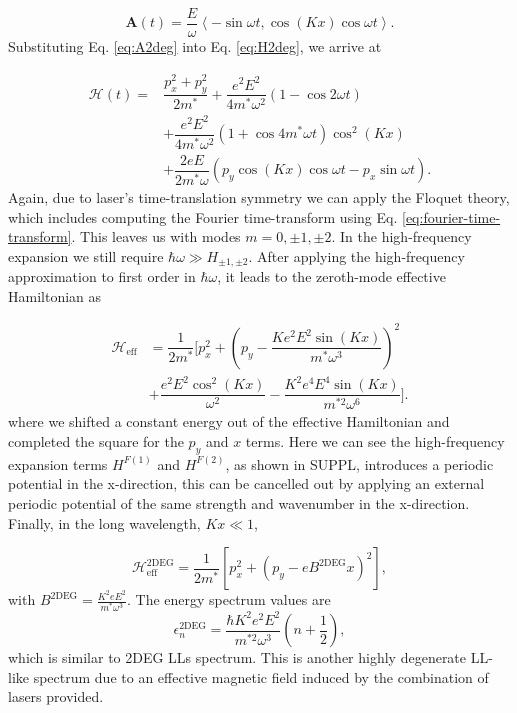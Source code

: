 \documentclass[aps,prb,twocolumn,showpacs,superscriptaddress]{revtex4-2}
\renewcommand{\vec}[1]{\mathbf{#1}}
\newcommand{\ham}{\mathcal{H}}
\begin{document}
\begin{equation}\label{eq:A2deg}
  \vec{A}(t)= \dfrac{E}{\omega} \left\langle -\sin \omega t, \cos{(Kx)} \cos{\omega t} \right\rangle.
\end{equation}%
Substituting Eq. \eqref{eq:A2deg} into Eq. \eqref{eq:H2deg}, we arrive at

\begin{align}\label{eq:H2time}
  \ham(t) = &\dfrac{p_x^2 + p_y^2}{2m^*} + \dfrac{e^2 E^2}{4m^* \omega^2}(1-\cos{2\omega t}) \nonumber \\
  &+ \dfrac{e^2 E^2}{4m^*\omega^2}(1+\cos{4m^* \omega t}) \cos^2{(Kx)} \nonumber \\
  &+\dfrac{2eE}{2m^* \omega} \left(p_y \cos{(Kx)}\cos{\omega t} -  p_x \sin{\omega t}\right).
\end{align}
Again, due to laser's time-translation symmetry we can apply the Floquet theory, which includes computing the Fourier time-transform using Eq. \eqref{eq:fourier-time-transform}.
This leaves us with modes $m=0,\pm1,\pm2$.
In the high-frequency expansion we still require $\hbar \omega \gg H_{\pm1,\pm2}$.
After applying the high-frequency approximation to first order in $\hbar \omega$, it leads to the zeroth-mode effective Hamiltonian as

\begin{align}\label{eq:H2eff}
  \ham_{\text{eff}} &= \dfrac{1}{2m^*} \Biggl[ p_x^2 + \left(p_y - \dfrac{K e^2 E^2 \sin{(Kx)}}{m^*\omega^3} \right)^2 \nonumber \\
  &+ \dfrac{e^2 E^2 \cos^2{(Kx)}}{\omega^2}  - \dfrac{K^2 e^4 E^4 \sin{(Kx)}}{m^{*2}\omega^6} \Biggr]. \nonumber
\end{align}
where we shifted a constant energy out of the effective Hamiltonian and completed the square for the $p_y$ and $x$ terms.
Here we can see the high-frequency expansion terms $H^{F(1)}$ and $H^{F(2)}$, as shown in SUPPL, introduces a periodic potential in the x-direction, this can be cancelled out by applying an external periodic potential of the same strength and wavenumber in the x-direction.
Finally, in the long wavelength, $Kx \ll 1$,

\begin{equation}\label{eq:Heff2deg}
  \ham_{\text{eff}}^{\text{2DEG}} = \dfrac{1}{2m^*} \left[ p_x^2 + {\left(p_y - eB^{\text{2DEG}}x \right)}^2  \right],
\end{equation}
with $B^{\text{2DEG}} = \tfrac{K^2 e E^2 }{m^*\omega^3}$.
The energy spectrum values are
\begin{equation}\label{eq:2DEGenergy}
  \epsilon_n^{\text{2DEG}} = \dfrac{\hbar K^2 e^2 E^2}{m^{*2}\omega^3} \left(n+\dfrac{1}{2}\right),
\end{equation}
which is similar to 2DEG LLs spectrum.
This is another highly degenerate LL-like spectrum due to an effective magnetic field induced by the combination of lasers provided.
\end{document}
